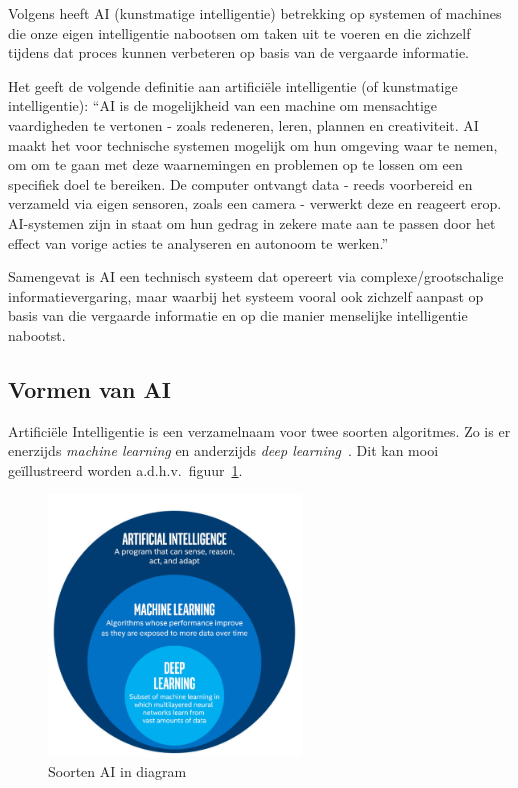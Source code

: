 Volgens \textcite{Oracle2014} heeft AI (kunstmatige intelligentie) betrekking op systemen of machines die onze eigen intelligentie nabootsen om taken uit te voeren en die zichzelf tijdens dat proces kunnen verbeteren op basis van de vergaarde informatie.

Het \textcite{EuropeesParlement2020} geeft de volgende definitie aan artificiële intelligentie (of kunstmatige intelligentie): ``AI is de mogelijkheid van een machine om mensachtige vaardigheden te vertonen - zoals redeneren, leren, plannen en creativiteit.
AI maakt het voor technische systemen mogelijk om hun omgeving waar te nemen, om om te gaan met deze waarnemingen en problemen op te lossen om een specifiek doel te bereiken. De computer ontvangt data - reeds voorbereid en verzameld via eigen sensoren, zoals een camera - verwerkt deze en reageert erop.
AI-systemen zijn in staat om hun gedrag in zekere mate aan te passen door het effect van vorige acties te analyseren en autonoom te werken.''

Samengevat is AI een technisch systeem dat opereert via complexe/grootschalige informatievergaring, maar waarbij het systeem vooral ook zichzelf aanpast op basis van die vergaarde informatie en op die manier menselijke intelligentie nabootst.

\subsection{Vormen van AI}
Artificiële Intelligentie is een verzamelnaam voor twee soorten algoritmes. Zo is er enerzijds \textit{machine learning} en anderzijds \textit{deep learning}~\autocite{Kavlakoglu2020}.
Dit kan mooi geïllustreerd worden a.d.h.v.\ figuur~\ref{fig:soorten_ai_diagram}.

\begin{figure}
    \centering
    \includegraphics[width=0.6\textwidth]{./img/ai_fields}
    \caption{\label{fig:soorten_ai_diagram} Soorten AI in diagram~\autocite{Bansal2019}}
\end{figure}

